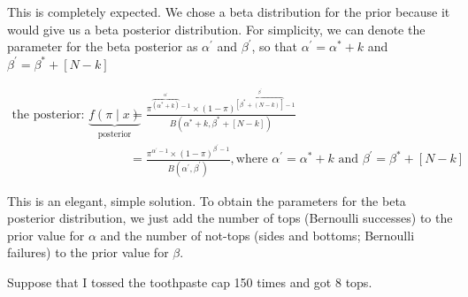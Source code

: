 \documentclass[
]{book}
\begin{document}
This is completely expected. We chose a beta distribution for the prior because it would give us a beta posterior distribution. For simplicity, we can denote the parameter for the beta posterior as \(\alpha^\prime\) and \(\beta^\prime\), so that \(\alpha^\prime = \alpha^* + k\) and \(\beta^\prime = \beta^* + [N - k]\)

\[
\begin{aligned}
\text{the posterior: } \displaystyle \underbrace{f(\pi \mid x)}_{\text{posterior}} &= \frac{ \pi^{\overbrace{(\alpha^* + k)}^{\alpha^\prime} - 1}  \times  (1 - \pi)^{\overbrace{[\beta^* + (N - k)]}^{\beta^\prime} - 1}  }{ B(\alpha^* + k, \beta^* + [N - k])} \\
&= \frac{ \pi^{\alpha^\prime - 1}  \times  (1 - \pi)^{\beta^\prime - 1}  }{ B(\alpha^\prime, \beta^\prime)}, \text{where } \alpha^\prime = \alpha^* + k \text{ and } \beta^\prime = \beta^* + [N - k]
\end{aligned}
\]

This is an elegant, simple solution. To obtain the parameters for the beta posterior distribution, we just add the number of tops (Bernoulli successes) to the prior value for \(\alpha\) and the number of not-tops (sides and bottoms; Bernoulli failures) to the prior value for \(\beta\).

Suppose that I tossed the toothpaste cap 150 times and got 8 tops.
\end{document}
